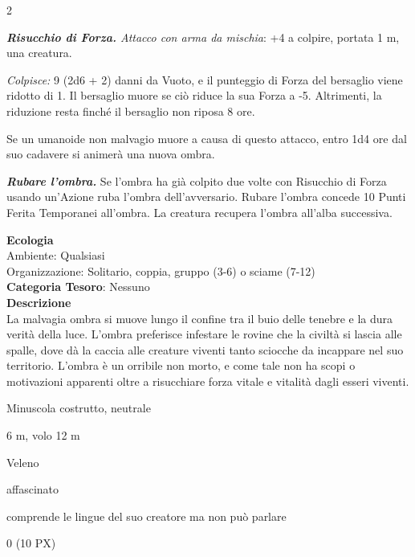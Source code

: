 \begin{multicols}{2}
{\emph{\textbf{Risucchio di Forza.} Attacco con arma da mischia}: +4 a colpire, portata 1 m, una creatura.

\emph{Colpisce:} 9 (2d6 + 2) danni da Vuoto, e il punteggio di Forza del bersaglio viene ridotto di 1. Il bersaglio muore se ciò riduce la sua Forza a -5. Altrimenti, la riduzione resta finché il bersaglio non riposa 8 ore.

Se un umanoide non malvagio muore a causa di questo attacco, entro 1d4 ore dal suo cadavere si animerà una nuova ombra.

\emph{\textbf{Rubare l'ombra.}} Se l'ombra ha già colpito due volte con Risucchio di Forza usando un'Azione ruba l'ombra dell'avversario. Rubare l'ombra concede 10 Punti Ferita Temporanei all'ombra. La creatura recupera l'ombra all'alba successiva.

\textbf{Ecologia}\\
Ambiente: Qualsiasi\\
Organizzazione: Solitario, coppia, gruppo (3-6) o sciame (7-12)\\
\textbf{Categoria Tesoro}: Nessuno\\
\textbf{Descrizione}\\
La malvagia ombra si muove lungo il confine tra il buio delle tenebre e la dura verità della luce. L'ombra preferisce infestare le rovine che la civiltà si lascia alle spalle, dove dà la caccia alle creature viventi tanto sciocche da incappare nel suo territorio. L'ombra è un orribile non morto, e come tale non ha scopi o motivazioni apparenti oltre a risucchiare forza vitale e vitalità dagli esseri viventi.

\begin{description}[noitemsep, topsep=0pt, parsep=0pt, partopsep=0pt, itemsep=1pt, leftmargin=2.35cm,  labelwidth=2.2cm, itemindent=0cm, listparindent=0pt] %
\setlength{\baselineskip}{10pt}
\item[\textbf{Taglia/Tipo}] Minuscola costrutto, neutrale
\item[\textbf{Caratt.}] 
\item[\textbf{Punti Ferita}] 
\item[\textbf{Movimento}] 6 m, volo 12 m
\item[\textbf{Tiri Salvez.}] 
\item[\textbf{Imm. Danni}] Veleno
\item[\textbf{Immunità}] affascinato
\item[\textbf{Sensi}] 
\item[\textbf{Linguaggi}] comprende le lingue del suo creatore ma non può parlare
\item[\textbf{Sfida}] 0 (10 PX)
\end{description}
\smallskip

}
\end{multicols}
